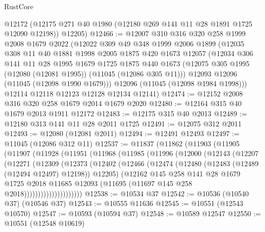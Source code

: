 \begin{lexlean}{RustCore}
\begin{coremodule}
      @12172
      (@12175 @271 @40 @1980 (@12180 @269 @141 @11 @28 @1891 @1725 @12090 @12198))
      @12205)
@12466 := @12007
    @310
    @316
    @320
    @258
    @1999
    @2008
    @1679
    @2022
    (@12022
      @309
      @49
      @348
      @1999
      @2006
      @1899
      (@12035
        @308
        @11
        @40
        @1881
        @1998
        @2005
        @1875
        @420
        @1673
        @12057
        (@12034
          @306
          @141
          @11
          @28
          @1995
          @1679
          @1725
          @1875
          @440
          @1673
          (@12075 @305 @1995 (@12080 (@12081 @1995)) (@11045 (@12086 @305 @11)))
          @12093
          @12096
          (@11045 (@12098 @1990 @1679)))
        @12096
        (@11045 (@12098 @1984 @1998)))
      @12114
      @12118
      @12123
      @12128
      @12134
      @12141)
@12474 := @12152 @2008 @316 @320 @258 @1679 @2014 @1679 @2020
@12480 := @12164 @315 @40 @1679 @2013 @1911 @12172
@12483 := @12175 @315 @40 @2013
@12489 := @12180 @313 @141 @11 @28 @2011 @1725
@12491 := @12075 @312 @2011
@12493 := @12080 (@12081 @2011)
@12494 := @12491 @12493
@12497 := @11045 (@12086 @312 @11)
@12537 := @11837
    (@11862
      (@11903
        (@11905
          (@11907
            (@11928
              (@11951
                (@11968
                  (@11985
                    (@11996
                      (@12000
                        (@12143
                          (@12207
                            (@12271
                              (@12309
                                (@12373
                                  (@12402
                                    (@12466
                                      (@12474
                                        (@12480 (@12483 (@12489 (@12494 @12497) @12198)) @12205)
                                        (@12162
                                          @145
                                          @258
                                          @141
                                          @28
                                          @1679
                                          @1725
                                          @2018
                                          @11685
                                          @12093
                                          (@11695 (@11697 @145 @258 @2018)))))))))))))))))))))
@12538 := @10534 @37
@12542 := @10536 (@10540 @37) (@10546 @37)
@12543 := @10555 @11636
@12545 := @10551 (@12543 @10570)
@12547 := @10593 (@10594 @37)
@12548 := @10589 @12547
@12550 := @10551 (@12548 @10619)

\end{coremodule}
\end{lexlean}
